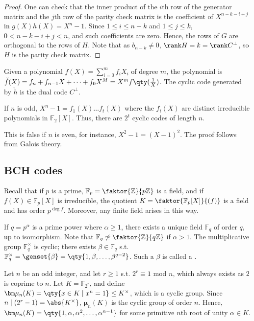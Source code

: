 \begin{proof}
    One can check that the inner product of the $i$th row of the generator matrix and the $j$th row of the parity check matrix is the coefficient of $X^{n-k-i+j}$ in $g(X) h(X) = X^n - 1$.
    Since $1 \leq i \leq n - k$ and $1 \leq j \leq k$, $0 < n - k - i + j < n$, and such coefficients are zero.
    Hence, the rows of $G$ are orthogonal to the rows of $H$.
    Note that as $b_{n-k} \neq 0$, $\rank H = k = \rank C^\perp$, so $H$ is the parity check matrix.
\end{proof}

\begin{remark}
    Given a polynomial $f(X) = \sum_{i=0}^m f_i X_i$ of degree $m$, the  polynomial is $\check{f}(X) = f_n + f_{n-1}X + \dots + f_0 X^M = X^m f\qty(\frac{1}{X})$.
    The cyclic code generated by $\check{h}$ is the dual code $C^\perp$.
\end{remark}

\begin{lemma}
    If $n$ is odd, $X^n - 1 = f_1(X) \dots f_t(X)$ where the $f_i(X)$ are distinct irreducible polynomials in $\mathbb F_2[X]$.
    Thus, there are $2^t$ cyclic codes of length $n$.
\end{lemma}

This is false if $n$ is even, for instance, $X^2 - 1 = (X - 1)^2$.
The proof follows from Galois theory.

\subsection{BCH codes}
Recall that if $p$ is a prime, $\mathbb F_p = \faktor{\mathbb Z}{p\mathbb Z}$ is a field, and if $f(X) \in \mathbb F_p[X]$ is irreducible, the quotient $K = \faktor{\mathbb F_p[X]}{(f)}$ is a field and has order $p^{\deg f}$.
Moreover, any finite field arises in this way.

If $q = p^\alpha$ is a prime power where $\alpha \geq 1$, there exists a unique field $\mathbb F_q$ of order $q$, up to isomorphism.
Note that $\mathbb F_q \not\simeq \faktor{\mathbb Z}{q\mathbb Z}$ if $\alpha > 1$.
The multiplicative group $\mathbb F_q^\times$ is cyclic; there exists $\beta \in \mathbb F_q$ s.t. $\mathbb F_q^\times = \genset{\beta} = \qty{1, \beta, \dots, \beta^{q-2}}$.
Such a $\beta$ is called a .

Let $n$ be an odd integer, and let $r \geq 1$ s.t. $2^r \equiv 1$ mod $n$, which always exists as $2$ is coprime to $n$.
Let $K = \mathbb F_{2^r}$, and define $\bm \mu_n(K) = \qty{x \in K \mid x^n = 1} \leq K^\times$, which is a cyclic group.
Since $n \mid (2^r - 1) = \abs{K^\times}$, $\bm \mu_n(K)$ is the cyclic group of order $n$.
Hence, $\bm \mu_n(K) = \qty{1, \alpha, \alpha^2, \dots, \alpha^{n-1}}$ for some primitive $n$th root of unity $\alpha \in K$.

